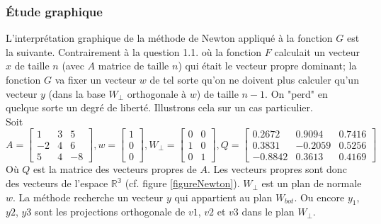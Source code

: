 \subsubsection{Étude graphique}
L'interprétation graphique de la méthode de Newton appliqué à la fonction $G$ est la suivante. Contrairement à la question 1.1. où la fonction $F$ calculait un vecteur $x$ de taille $n$ (avec $A$ matrice de taille $n$) qui était le vecteur propre dominant; la fonction $G$ va fixer un vecteur $w$ de tel sorte qu'on ne doivent plus calculer qu'un vecteur $y$ (dans la base $W_{\bot}$ orthogonale à $w$) de taille $n-1$. On "perd" en quelque sorte un degré de liberté. Illustrons cela sur un cas particulier.\\

Soit $A=  \left[ 
\begin{matrix}
1 & 3 & 5 \\
-2 & 4 & 6 \\
5 & 4 & -8
\end{matrix} \right] 
, w = 
\left[ 
\begin{matrix}
1 \\
0\\
0
\end{matrix} \right] , 
W_{\bot} = 
\left[ 
\begin{matrix}
0 & 0 \\
1 & 0 \\
0 & 1 
\end{matrix} \right] , 
Q=
\left[ 
\begin{matrix}
0.2672 & 0.9094 & 0.7416 \\
0.3831 & -0.2059 & 0.5256 \\
-0.8842 & 0.3613 & 0.4169
\end{matrix} \right] 
$\\
Où $Q$ est la matrice des vecteurs propres de $A$. Les vecteurs propres sont donc des vecteurs de l'espace $\mathbb{R^3}$ (cf. figure \ref{figureNewton}). $W_{\bot}$ est un plan de normale $w$. La méthode recherche un vecteur $y$ qui appartient au plan $W_{bot}$. Ou encore $y_1$, $y2$, $y3$ sont les projections orthogonale de $v1$, $v2$ et $v3$ dans le plan $W_{\bot}$.

